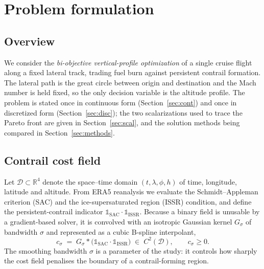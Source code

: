 %

\makeatletter
{}
\makeatother

\section{Problem formulation}
\label{sec:formulation}

\subsection{Overview}

We consider the \emph{bi-objective vertical-profile optimization} of a single
cruise flight along a fixed lateral track, trading fuel burn against persistent
contrail formation. The lateral path is the great circle between origin and
destination and the Mach number is held fixed, so the only decision variable is
the altitude profile. The problem is stated once in continuous form
(Section~\ref{sec:cont}) and once in discretized form
(Section~\ref{sec:disc}); the two scalarizations used to trace the Pareto front
are given in Section~\ref{sec:scal}, and the solution methods being compared in
Section~\ref{sec:methods}.

\subsection{Contrail cost field}
\label{sec:cost}

Let $\mathcal{D}\subset\mathbb{R}^4$ denote the space--time domain
$(t,\lambda,\phi,h)$ of time, longitude, latitude and altitude. From ERA5
reanalysis we evaluate the Schmidt--Appleman criterion (SAC) and the
ice-supersaturated region (ISSR) condition, and define the persistent-contrail
indicator $\mathbb{1}_{\mathrm{SAC}}\cdot\mathbb{1}_{\mathrm{ISSR}}$. Because a
binary field is unusable by a gradient-based solver, it is convolved with an
isotropic Gaussian kernel $G_\sigma$ of bandwidth $\sigma$ and represented as a
cubic B-spline interpolant,
%
\begin{equation}
  c_\sigma \;=\; G_\sigma * \bigl(\mathbb{1}_{\mathrm{SAC}}\cdot
  \mathbb{1}_{\mathrm{ISSR}}\bigr) \;\in\; C^{2}(\mathcal{D}),
  \qquad c_\sigma \ge 0 .
  \label{eq:cost-field}
\end{equation}
%
The smoothing bandwidth $\sigma$ is a parameter of the study: it controls how
sharply the cost field penalises the boundary of a contrail-forming region.

